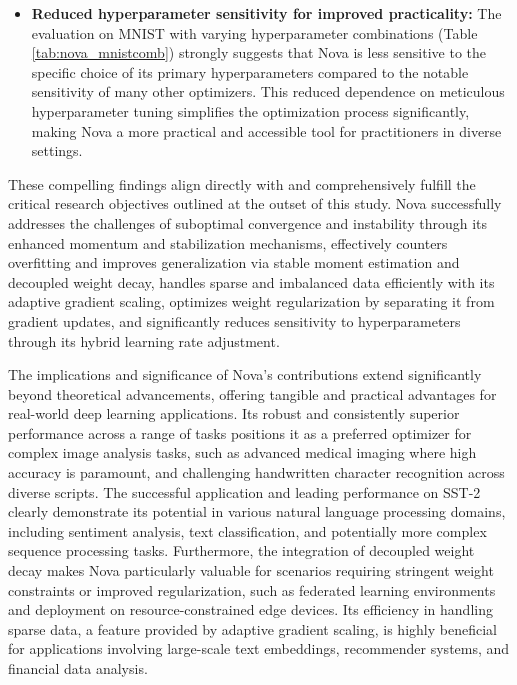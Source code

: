 \documentclass{article}
\begin{document}
\begin{itemize}
    \item \textbf{Reduced hyperparameter sensitivity for improved practicality:} The evaluation on MNIST with varying hyperparameter combinations (Table \ref{tab:nova_mnistcomb}) strongly suggests that Nova is less sensitive to the specific choice of its primary hyperparameters compared to the notable sensitivity of many other optimizers. This reduced dependence on meticulous hyperparameter tuning simplifies the optimization process significantly, making Nova a more practical and accessible tool for practitioners in diverse settings.
\end{itemize}

These compelling findings align directly with and comprehensively fulfill the critical research objectives outlined at the outset of this study. Nova successfully addresses the challenges of suboptimal convergence and instability through its enhanced momentum and stabilization mechanisms, effectively counters overfitting and improves generalization via stable moment estimation and decoupled weight decay, handles sparse and imbalanced data efficiently with its adaptive gradient scaling, optimizes weight regularization by separating it from gradient updates, and significantly reduces sensitivity to hyperparameters through its hybrid learning rate adjustment.

The implications and significance of Nova's contributions extend significantly beyond theoretical advancements, offering tangible and practical advantages for real-world deep learning applications. Its robust and consistently superior performance across a range of tasks positions it as a preferred optimizer for complex image analysis tasks, such as advanced medical imaging where high accuracy is paramount, and challenging handwritten character recognition across diverse scripts. The successful application and leading performance on SST-2 clearly demonstrate its potential in various natural language processing domains, including sentiment analysis, text classification, and potentially more complex sequence processing tasks. Furthermore, the integration of decoupled weight decay makes Nova particularly valuable for scenarios requiring stringent weight constraints or improved regularization, such as federated learning environments and deployment on resource-constrained edge devices. Its efficiency in handling sparse data, a feature provided by adaptive gradient scaling, is highly beneficial for applications involving large-scale text embeddings, recommender systems, and financial data analysis.
\end{document}
